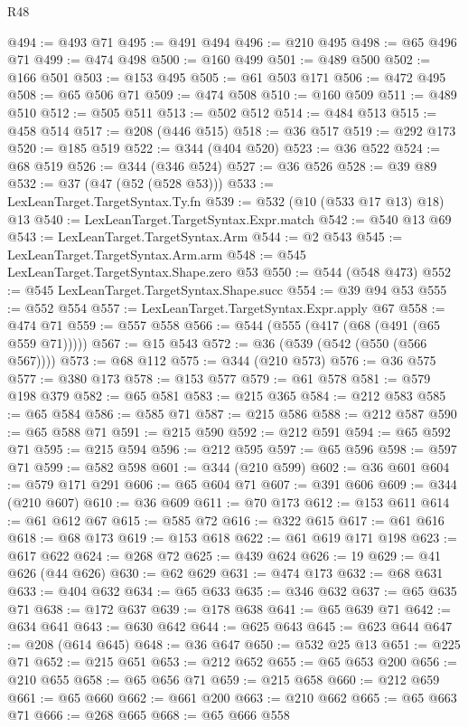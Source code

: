\begin{lexlean}{R48}
\begin{coremodule}
@494 := @493 @71
@495 := @491 @494
@496 := @210 @495
@498 := @65 @496 @71
@499 := @474 @498
@500 := @160 @499
@501 := @489 @500
@502 := @166 @501
@503 := @153 @495
@505 := @61 @503 @171
@506 := @472 @495
@508 := @65 @506 @71
@509 := @474 @508
@510 := @160 @509
@511 := @489 @510
@512 := @505 @511
@513 := @502 @512
@514 := @484 @513
@515 := @458 @514
@517 := @208 (@446 @515)
@518 := @36 @517
@519 := @292 @173
@520 := @185 @519
@522 := @344 (@404 @520)
@523 := @36 @522
@524 := @68 @519
@526 := @344 (@346 @524)
@527 := @36 @526
@528 := @39 @89
@532 := @37 (@47 (@52 (@528 @53)))
@533 := LexLeanTarget.TargetSyntax.Ty.fn
@539 := @532 (@10 (@533 @17 @13) @18) @13
@540 := LexLeanTarget.TargetSyntax.Expr.match
@542 := @540 @13 @69
@543 := LexLeanTarget.TargetSyntax.Arm
@544 := @2 @543
@545 := LexLeanTarget.TargetSyntax.Arm.arm
@548 := @545 LexLeanTarget.TargetSyntax.Shape.zero @53
@550 := @544 (@548 @473)
@552 := @545 LexLeanTarget.TargetSyntax.Shape.succ
@554 := @39 @94 @53
@555 := @552 @554
@557 := LexLeanTarget.TargetSyntax.Expr.apply @67
@558 := @474 @71
@559 := @557 @558
@566 := @544 (@555 (@417 (@68 (@491 (@65 @559 @71)))))
@567 := @15 @543
@572 := @36 (@539 (@542 (@550 (@566 @567))))
@573 := @68 @112
@575 := @344 (@210 @573)
@576 := @36 @575
@577 := @380 @173
@578 := @153 @577
@579 := @61 @578
@581 := @579 @198 @379
@582 := @65 @581
@583 := @215 @365
@584 := @212 @583
@585 := @65 @584
@586 := @585 @71
@587 := @215 @586
@588 := @212 @587
@590 := @65 @588 @71
@591 := @215 @590
@592 := @212 @591
@594 := @65 @592 @71
@595 := @215 @594
@596 := @212 @595
@597 := @65 @596
@598 := @597 @71
@599 := @582 @598
@601 := @344 (@210 @599)
@602 := @36 @601
@604 := @579 @171 @291
@606 := @65 @604 @71
@607 := @391 @606
@609 := @344 (@210 @607)
@610 := @36 @609
@611 := @70 @173
@612 := @153 @611
@614 := @61 @612 @67
@615 := @585 @72
@616 := @322 @615
@617 := @61 @616
@618 := @68 @173
@619 := @153 @618
@622 := @61 @619 @171 @198
@623 := @617 @622
@624 := @268 @72
@625 := @439 @624
@626 := 19
@629 := @41 @626 (@44 @626)
@630 := @62 @629
@631 := @474 @173
@632 := @68 @631
@633 := @404 @632
@634 := @65 @633
@635 := @346 @632
@637 := @65 @635 @71
@638 := @172 @637
@639 := @178 @638
@641 := @65 @639 @71
@642 := @634 @641
@643 := @630 @642
@644 := @625 @643
@645 := @623 @644
@647 := @208 (@614 @645)
@648 := @36 @647
@650 := @532 @25 @13
@651 := @225 @71
@652 := @215 @651
@653 := @212 @652
@655 := @65 @653 @200
@656 := @210 @655
@658 := @65 @656 @71
@659 := @215 @658
@660 := @212 @659
@661 := @65 @660
@662 := @661 @200
@663 := @210 @662
@665 := @65 @663 @71
@666 := @268 @665
@668 := @65 @666 @558

\end{coremodule}
\end{lexlean}
